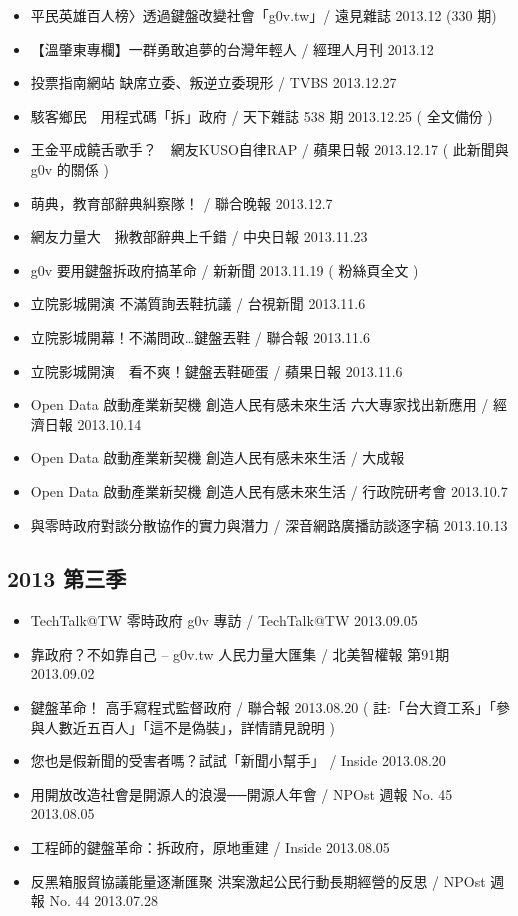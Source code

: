 \begin{itemize}
\item 平民英雄百人榜〉透過鍵盤改變社會「g0v.tw」/ 遠見雜誌 2013.12 (330 期)
\item 【溫肇東專欄】一群勇敢追夢的台灣年輕人 / 經理人月刊 2013.12
\item 投票指南網站 缺席立委、叛逆立委現形 / TVBS 2013.12.27
\item 駭客鄉民　用程式碼「拆」政府 / 天下雜誌 538 期 2013.12.25 ( 全文備份 )
\item 王金平成饒舌歌手？　網友KUSO自律RAP / 蘋果日報 2013.12.17 ( 此新聞與 g0v 的關係 )
\item 萌典，教育部辭典糾察隊！ / 聯合晚報 2013.12.7
\item 網友力量大　揪教部辭典上千錯 / 中央日報 2013.11.23
\item g0v 要用鍵盤拆政府搞革命 / 新新聞 2013.11.19 ( 粉絲頁全文 )
\item 立院影城開演 不滿質詢丟鞋抗議 / 台視新聞 2013.11.6
\item 立院影城開幕！不滿問政…鍵盤丟鞋 / 聯合報 2013.11.6
\item 立院影城開演　看不爽！鍵盤丟鞋砸蛋 / 蘋果日報 2013.11.6
\item Open Data 啟動產業新契機 創造人民有感未來生活 六大專家找出新應用 / 經濟日報 2013.10.14
\item Open Data 啟動產業新契機 創造人民有感未來生活 / 大成報
\item Open Data 啟動產業新契機 創造人民有感未來生活 / 行政院研考會 2013.10.7
\item 與零時政府對談分散協作的實力與潛力 / 深音網路廣播訪談逐字稿 2013.10.13
\end{itemize}


\subsection{2013 第三季}

\begin{itemize}
\item TechTalk@TW 零時政府 g0v 專訪 / TechTalk@TW 2013.09.05
\item 靠政府？不如靠自己 – g0v.tw 人民力量大匯集 / 北美智權報 第91期 2013.09.02
\item 鍵盤革命！ 高手寫程式監督政府 / 聯合報 2013.08.20 ( 註:「台大資工系」「參與人數近五百人」「這不是偽裝」，詳情請見說明 )
\item 您也是假新聞的受害者嗎？試試「新聞小幫手」 / Inside 2013.08.20
\item 用開放改造社會是開源人的浪漫──開源人年會 / NPOst 週報 No. 45 2013.08.05
\item 工程師的鍵盤革命：拆政府，原地重建 / Inside 2013.08.05
\item 反黑箱服貿協議能量逐漸匯聚 洪案激起公民行動長期經營的反思 / NPOst 週報 No. 44 2013.07.28
\end{itemize}


